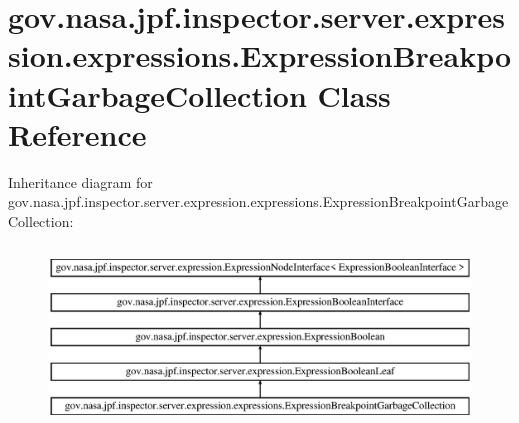 \hypertarget{classgov_1_1nasa_1_1jpf_1_1inspector_1_1server_1_1expression_1_1expressions_1_1_expression_breakpoint_garbage_collection}{}\section{gov.\+nasa.\+jpf.\+inspector.\+server.\+expression.\+expressions.\+Expression\+Breakpoint\+Garbage\+Collection Class Reference}
\label{classgov_1_1nasa_1_1jpf_1_1inspector_1_1server_1_1expression_1_1expressions_1_1_expression_breakpoint_garbage_collection}
Inheritance diagram for gov.\+nasa.\+jpf.\+inspector.\+server.\+expression.\+expressions.\+Expression\+Breakpoint\+Garbage\+Collection\+:\begin{figure}[H]
\begin{center}
\leavevmode
\includegraphics[height=4.827586cm]{classgov_1_1nasa_1_1jpf_1_1inspector_1_1server_1_1expression_1_1expressions_1_1_expression_breakpoint_garbage_collection}
\end{center}
\end{figure}
